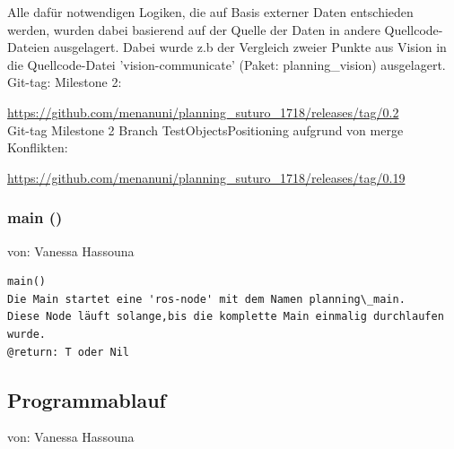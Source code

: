 \documentclass{suturo}
\makeatletter
\newcommand{\chapterauthor}[1]{%
  {\parindent0pt\vspace*{-27pt}%
  \linespread{0}\small\begin{flushright}von: #1\end{flushright}%
  \par\nobreak\vspace*{0pt}}
  \@afterheading%
}
\makeatother
\begin{document}
Alle dafür notwendigen Logiken, die auf Basis externer Daten entschieden werden, wurden dabei basierend auf der Quelle der Daten in andere Quellcode-Dateien ausgelagert. Dabei wurde z.b der Vergleich zweier Punkte aus Vision in die Quellcode-Datei 'vision-communicate' (Paket: planning\_vision) ausgelagert. \\


Git-tag: Milestone 2:

\url{https://github.com/menanuni/planning_suturo_1718/releases/tag/0.2} \\

Git-tag Milestone 2 Branch TestObjectsPositioning aufgrund von merge Konflikten:

\url{https://github.com/menanuni/planning_suturo_1718/releases/tag/0.19}\\

\subsubsection{main ()}
\chapterauthor{Vanessa Hassouna}
\begin{verbatim}
main()
Die Main startet eine 'ros-node' mit dem Namen planning\_main.
Diese Node läuft solange,bis die komplette Main einmalig durchlaufen wurde. 
@return: T oder Nil 
\end{verbatim}



\subsection{Programmablauf}
\chapterauthor{Vanessa Hassouna}


\begin{figure}[!htb]
\end{figure}
\end{document}
